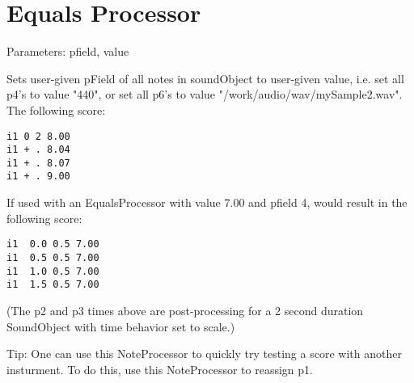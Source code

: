 \section{Equals Processor}\label{equalsProcessor}

Parameters: pfield, value

Sets user-given pField of all notes in soundObject to user-given value,
i.e. set all p4's to value "440", or set all p6's to value
"/work/audio/wav/mySample2.wav". The following score:

\begin{verbatim}
i1 0 2 8.00
i1 + . 8.04
i1 + . 8.07
i1 + . 9.00    
\end{verbatim}

If used with an EqualsProcessor with value 7.00 and pfield 4, would
result in the following score:

\begin{verbatim}
i1  0.0 0.5 7.00
i1  0.5 0.5 7.00
i1  1.0 0.5 7.00
i1  1.5 0.5 7.00
\end{verbatim}

(The p2 and p3 times above are post-processing for a 2 second duration
SoundObject with time behavior set to scale.)

Tip: One can use this NoteProcessor to quickly try testing a score with
another insturment. To do this, use this NoteProcessor to reassign p1.

